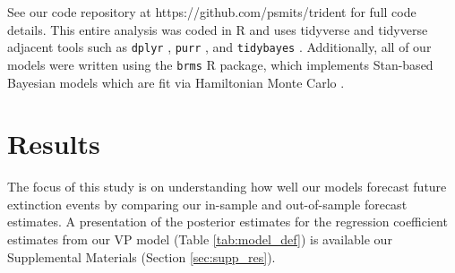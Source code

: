 \documentclass[12pt,letterpaper]{article}
\begin{document}
\begin{refsection}

See our code repository at https://github.com/psmits/trident for full code details. This entire analysis was coded in R and uses tidyverse and tidyverse adjacent tools such as \texttt{dplyr} \citep{dplyr}, \texttt{purr} \citep{purrr}, and \texttt{tidybayes} \citep{tidybayes}. Additionally, all of our models were written using the \texttt{brms} \citep{brms2017,brms2018} R package, which implements Stan-based Bayesian models which are fit via Hamiltonian Monte Carlo \citep{StanManual}.


\section{Results}

The focus of this study is on understanding how well our models forecast future extinction events by comparing our in-sample and out-of-sample forecast estimates. A presentation of the posterior estimates for the regression coefficient estimates from our VP model (Table \ref{tab:model_def}) is available our Supplemental Materials (Section \ref{sec:supp_res}).


\end{refsection}
\end{document}
